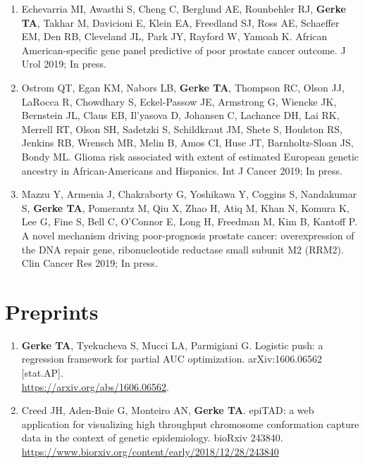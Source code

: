 \documentclass[11pt, a4paper]{article} %
\begin{document}
\begin{enumerate}[leftmargin=*]
\item{} Echevarria MI, Awasthi S, Cheng C, Berglund AE, Rounbehler RJ, {\bf Gerke TA}, Takhar M, Davicioni E, Klein EA, Freedland SJ, Ross AE, Schaeffer EM, Den RB, Cleveland JL, Park JY, Rayford W, Yamoah K. African American-specific gene panel predictive of poor prostate cancer outcome. J Urol 2019; In press.

\item{} Ostrom QT, Egan KM, Nabors LB, {\bf Gerke TA}, Thompson RC, Olson JJ, LaRocca R, Chowdhary S, Eckel-Passow JE, Armstrong G, Wiencke JK, Bernstein JL, Claus EB, Il'yasova D, Johansen C, Lachance DH, Lai RK, Merrell RT, Olson SH, Sadetzki S, Schildkraut JM, Shete S, Houlston RS, Jenkins RB, Wrensch MR, Melin B, Amos CI, Huse JT, Barnholtz-Sloan JS, Bondy ML. Glioma risk associated with extent of estimated European genetic ancestry in African-Americans and Hispanics. Int J Cancer 2019; In press.

\item Mazzu Y, Armenia J, Chakraborty G, Yoshikawa Y, Coggins S, Nandakumar S, {\bf Gerke TA}, Pomerantz M, Qiu X, Zhao H, Atiq M, Khan N, Komura K, Lee G, Fine S, Bell C, O'Connor E, Long H, Freedman M, Kim B, Kantoff P. A novel mechanism driving poor-prognosis prostate cancer: overexpression of the DNA repair gene, ribonucleotide reductase small subunit M2 (RRM2). Clin Cancer Res 2019; In press.

\end{enumerate}

\section*{Preprints}
\begin{enumerate}[leftmargin=*]
\item{} {\bf Gerke TA}, Tyekucheva S, Mucci LA, Parmigiani G. Logistic push: a regression framework for partial AUC optimization. arXiv:1606.06562 [stat.AP].\\\href{https://arxiv.org/abs/1606.06562}{https://arxiv.org/abs/1606.06562}.

\item{} Creed JH, Aden-Buie G, Monteiro AN, {\bf Gerke TA}. epiTAD: a web application for visualizing high throughput chromosome conformation capture data in the context of genetic epidemiology. bioRxiv 243840. \\\href{https://www.biorxiv.org/content/early/2018/12/28/243840}{https://www.biorxiv.org/content/early/2018/12/28/243840}
\end{enumerate}
\end{document}
